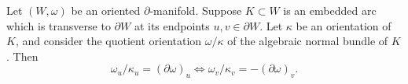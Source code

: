 Let $(W, \omega)$ be an oriented $\partial$-manifold. Suppose $K \subset W$ is an embedded arc which is transverse to $\partial W$ at its endpoints $u, v \in \partial W$. Let $\kappa$ be an orientation of $K$, and consider the quotient orientation $\omega/\kappa$ of the algebraic normal bundle of $K$. Then
$$\omega_u/\kappa_u = (\partial \omega)_u \Longleftrightarrow \omega_v/\kappa_v = -(\partial \omega)_v.$$
